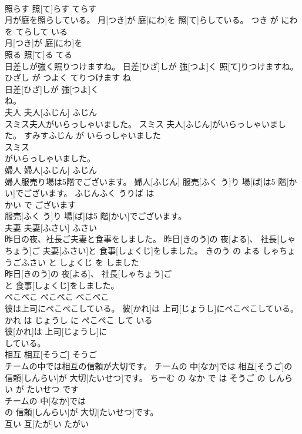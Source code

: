 \documentclass[8pt]{extreport}
\begin{document}
\begin{CJK}{UTF8}{min}
\\	照らす	照[て]らす	てらす	
\\	月が庭を照らしている。	月[つき]が 庭[にわ]を 照[て]らしている。	つき が にわ を てらして いる	
\\	月[つき]が 庭[にわ]を
\\	照る	照[て]る	てる	
\\	日差しが強く照りつけますね。	日差[ひざ]しが 強[つよ]く 照[て]りつけますね。	ひざし が つよく てりつけます ね	
\\	日差[ひざ]しが 強[つよ]く
\\	ね。			
\\	夫人	夫人[ふじん]	ふじん	
\\	スミス夫人がいらっしゃいました。	スミス 夫人[ふじん]がいらっしゃいました。	すみすふじん が いらっしゃいました	
\\	スミス
\\	がいらっしゃいました。			
\\	婦人	婦人[ふじん]	ふじん	
\\	婦人服売り場は5階でございます。	婦人[ふじん] 服売[ふく う]り 場[ば]は5 階[かい]でございます。	ふじんふく うりば は 
\\	かい で ございます	
\\	服売[ふく う]り 場[ば]は5 階[かい]でございます。			
\\	夫妻	夫妻[ふさい]	ふさい	
\\	昨日の夜、社長ご夫妻と食事をしました。	昨日[きのう]の 夜[よる]、 社長[しゃちょう]ご 夫妻[ふさい]と 食事[しょくじ]をしました。	きのう の よる しゃちょうごふさい と しょくじ を しました	
\\	昨日[きのう]の 夜[よる]、 社長[しゃちょう]ご
\\	と 食事[しょくじ]をしました。			
\\	ぺこぺこ	ぺこぺこ	ぺこぺこ	
\\	彼は上司にぺこぺこしている。	彼[かれ]は 上司[じょうし]にぺこぺこしている。	かれ は じょうし に ぺこぺこ して いる	
\\	彼[かれ]は 上司[じょうし]に
\\	している。			
\\	相互	相互[そうご]	そうご	
\\	チームの中では相互の信頼が大切です。	チームの 中[なか]では 相互[そうご]の 信頼[しんらい]が 大切[たいせつ]です。	ちーむ の なか で は そうご の しんらい が たいせつ です	
\\	チームの 中[なか]では
\\	の 信頼[しんらい]が 大切[たいせつ]です。			
\\	互い	互[たが]い	たがい	

\end{CJK}
\end{document}
